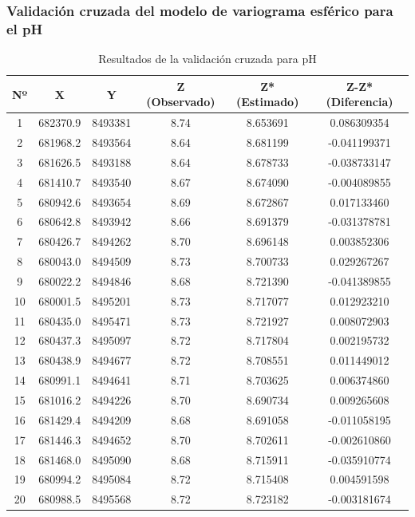 \subsubsection{Validación cruzada del modelo de variograma esférico para el pH}
\begin{table}[H]
\centering
\caption{Resultados de la validación cruzada para pH}
\label{tab:cross_validation_pH}
\begin{tabular}{cccccc}
\hline
\textbf{Nº} & \textbf{X} & \textbf{Y} & \textbf{Z (Observado)} & \textbf{Z* (Estimado)} & \textbf{Z-Z* (Diferencia)} \\ \hline
1 & 682370.9 & 8493381 & 8.74 & 8.653691 & 0.086309354 \\
2 & 681968.2 & 8493564 & 8.64 & 8.681199 & -0.041199371 \\
3 & 681626.5 & 8493188 & 8.64 & 8.678733 & -0.038733147 \\
4 & 681410.7 & 8493540 & 8.67 & 8.674090 & -0.004089855 \\
5 & 680942.6 & 8493654 & 8.69 & 8.672867 & 0.017133460 \\
6 & 680642.8 & 8493942 & 8.66 & 8.691379 & -0.031378781 \\
7 & 680426.7 & 8494262 & 8.70 & 8.696148 & 0.003852306 \\
8 & 680043.0 & 8494509 & 8.73 & 8.700733 & 0.029267267 \\
9 & 680022.2 & 8494846 & 8.68 & 8.721390 & -0.041389855 \\
10 & 680001.5 & 8495201 & 8.73 & 8.717077 & 0.012923210 \\
11 & 680435.0 & 8495471 & 8.73 & 8.721927 & 0.008072903 \\
12 & 680437.3 & 8495097 & 8.72 & 8.717804 & 0.002195732 \\
13 & 680438.9 & 8494677 & 8.72 & 8.708551 & 0.011449012 \\
14 & 680991.1 & 8494641 & 8.71 & 8.703625 & 0.006374860 \\
15 & 681016.2 & 8494226 & 8.70 & 8.690734 & 0.009265608 \\
16 & 681429.4 & 8494209 & 8.68 & 8.691058 & -0.011058195 \\
17 & 681446.3 & 8494652 & 8.70 & 8.702611 & -0.002610860 \\
18 & 681468.0 & 8495090 & 8.68 & 8.715911 & -0.035910774 \\
19 & 680994.2 & 8495084 & 8.72 & 8.715408 & 0.004591598 \\
20 & 680988.5 & 8495568 & 8.72 & 8.723182 & -0.003181674 \\

\end{tabular}
\end{table}
